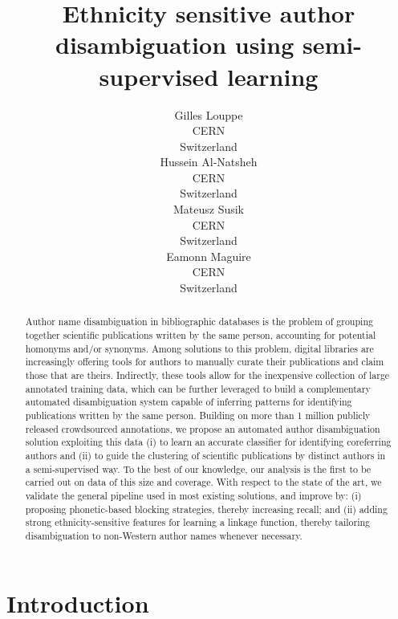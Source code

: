 \documentclass{article}
\title{Ethnicity sensitive author disambiguation using semi-supervised learning}
\author{Gilles Louppe\\
        CERN\\
        Switzerland\\
\And Hussein Al-Natsheh\\
        CERN\\
        Switzerland\\
\And Mateusz Susik\\
        CERN\\
        Switzerland\\
\And Eamonn Maguire\\
        CERN\\
        Switzerland}
\date{}
\begin{document}
\maketitle

\begin{abstract}

Author name disambiguation in bibliographic databases is the problem of
grouping together scientific publications written by the same person, accounting
for potential homonyms and/or synonyms.
Among solutions to this problem, digital libraries are increasingly offering tools
for authors to manually curate their publications and claim those that are theirs.
Indirectly, these tools allow for the inexpensive collection of large annotated training
data, which can be further leveraged to build a complementary automated
disambiguation system capable of inferring patterns for identifying
publications written by the same person.
Building on more than 1 million publicly released crowdsourced annotations,
we propose an automated author disambiguation solution exploiting this data (i) to learn
an accurate classifier for identifying coreferring authors and (ii) to guide the clustering
of scientific publications by distinct authors in a semi-supervised way.
To the best of our knowledge, our analysis is the first to be carried out on data of
this size and coverage.
With respect to the state of the art, we validate the general pipeline used in most existing
solutions, and improve by: (i) proposing phonetic-based blocking strategies, thereby
increasing recall; and (ii) adding strong ethnicity-sensitive features for learning a linkage
function, thereby tailoring disambiguation to non-Western author names whenever necessary.


\end{abstract}



\section{Introduction}
\label{introduction}

\end{document}
